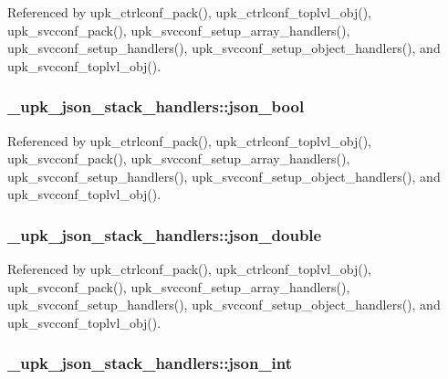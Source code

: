 Referenced by upk\_\-ctrlconf\_\-pack(), upk\_\-ctrlconf\_\-toplvl\_\-obj(), upk\_\-svcconf\_\-pack(), upk\_\-svcconf\_\-setup\_\-array\_\-handlers(), upk\_\-svcconf\_\-setup\_\-handlers(), upk\_\-svcconf\_\-setup\_\-object\_\-handlers(), and upk\_\-svcconf\_\-toplvl\_\-obj().

\subsubsection[{json\_\-bool}]{ {\bf \_\-upk\_\-json\_\-stack\_\-handlers::json\_\-bool}}\label{struct__upk__json__stack__handlers_af3bf1287a53d8f3d22463ba4513c23de}


Referenced by upk\_\-ctrlconf\_\-pack(), upk\_\-ctrlconf\_\-toplvl\_\-obj(), upk\_\-svcconf\_\-pack(), upk\_\-svcconf\_\-setup\_\-array\_\-handlers(), upk\_\-svcconf\_\-setup\_\-handlers(), upk\_\-svcconf\_\-setup\_\-object\_\-handlers(), and upk\_\-svcconf\_\-toplvl\_\-obj().

\subsubsection[{json\_\-double}]{ {\bf \_\-upk\_\-json\_\-stack\_\-handlers::json\_\-double}}\label{struct__upk__json__stack__handlers_a564ecb9ea1b4e7dd602b6647d4cdb126}


Referenced by upk\_\-ctrlconf\_\-pack(), upk\_\-ctrlconf\_\-toplvl\_\-obj(), upk\_\-svcconf\_\-pack(), upk\_\-svcconf\_\-setup\_\-array\_\-handlers(), upk\_\-svcconf\_\-setup\_\-handlers(), upk\_\-svcconf\_\-setup\_\-object\_\-handlers(), and upk\_\-svcconf\_\-toplvl\_\-obj().

\subsubsection[{json\_\-int}]{ {\bf \_\-upk\_\-json\_\-stack\_\-handlers::json\_\-int}}\label{struct__upk__json__stack__handlers_aa836b0acf4f7062dab95a34d879e18bf}


